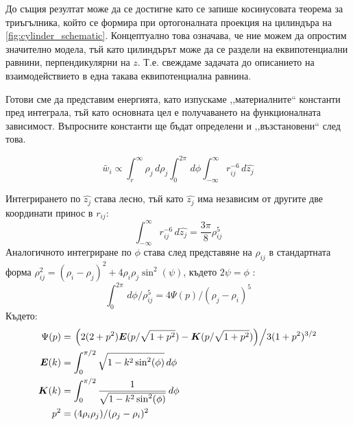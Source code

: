 До същия резултат може да се достигне като се запише косинусовата теорема за триъгълника, който се формира при ортогоналната проекция на цилиндъра на \autoref{fig:cylinder_schematic}.
Концептуално това означава, че ние можем да опростим значително модела, тъй като цилиндърът може да се раздели на еквипотенциални равнини, перпендикулярни на $z$. Т.е. свеждаме задачата
до описанието на взаимодействието в една такава еквипотенциална равнина.

Готови сме да представим енергията, като изпускаме ,,материалните`` константи пред интеграла, тъй като основната цел е получаването на функционалната зависимост. Въпросните константи ще бъдат
определени и ,,възстановени`` след това.

\begin{equation}
	\label{eq:energy_integral_raw}
	\tilde{w_i} \displaystyle\propto \displaystyle\int_{r}^{\infty} \rho_{j} \,d\rho_{j} \displaystyle\int_{0}^{2\pi} \,d\phi \displaystyle\int_{-\infty}^{\infty} r_{ij}^{-6} \,d\hat{z_{j}}
\end{equation}

Интегрирането по $\hat{z_j}$ става лесно, тъй като $\hat{z_{j}}$ има независим от другите две координати принос в $r_{ij}$:
\begin{equation*}
	\displaystyle\int_{-\infty}^{\infty} r_{ij}^{-6} \,d\hat{z_{j}} = \frac{3\pi}{8} \rho_{ij}^5
\end{equation*}
Аналогичното интегриране по $\phi$ става след представяне на $\rho_{ij}$ в стандартната форма $\rho_{ij}^2 = (\rho_i - \rho_j)^2 + 4 \rho_i \rho_j \sin^2(\psi)$, където $2\psi=\phi$ \cite{gradshteyn}:
\begin{equation*}
	\displaystyle\int_{0}^{2\pi} \,d\phi/\rho_{ij}^5 = 4\Psi(p)/(\rho_j-\rho_i)^5
\end{equation*} 
Където:
\begin{align*}
	\Psi(p)           & = \left. \left(2(2+p^2)\boldsymbol{E}(p/\sqrt{1+p^2}) - \boldsymbol{K}(p/\sqrt{1+p^2})\right)\middle/3(1+p^2)^{3/2}\right. \\
	\boldsymbol{E}(k) & = \displaystyle\int_{0}^{\pi/2} \sqrt{1-k^2 \sin^2(\phi)} \,d\phi                                                          \\
	\boldsymbol{K}(k) & = \displaystyle\int_{0}^{\pi/2} \frac{1}{\sqrt{1-k^2 \sin^2(\phi)}} \,d\phi                                                \\
	p^2               & = (4 \rho_i \rho_j)/(\rho_j - \rho_i)^2                                                                                    
\end{align*}

